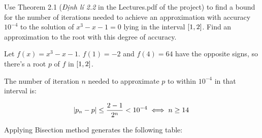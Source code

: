 \documentclass[../../Assignments.tex]{subfiles}
\begin{document}
\begin{exercise}
    Use Theorem 2.1 (\emph{Định lí 2.2} in the Lectures.pdf of the project) to
    find a bound for the number of iterations needed to achieve an approximation
    with accuracy \(10^{-4}\) to the solution of \(x^3 - x − 1 = 0\) lying in
    the interval \(\interval{1}{2}\). Find an approximation to the root with
    this degree of accuracy.
\end{exercise}

\begin{solution}
    Let \(f(x) = x^3 - x − 1\). \(f(1) = -2\) and \(f(4) = 64\) have the
    opposite signs, so there's a root \(p\) of \(f\) in \(\interval{1}{2}\).

    The number of iteration \(n\) needed to approximate \(p\) to within
    \(10^{-4}\) in that interval is:

    \[\abs{p_n - p} \leq \frac{2 - 1}{2^n} < 10^{-4} \iff n \geq 14\]

    Applying Bisection method generates the following table:


\end{solution}
\end{document}
